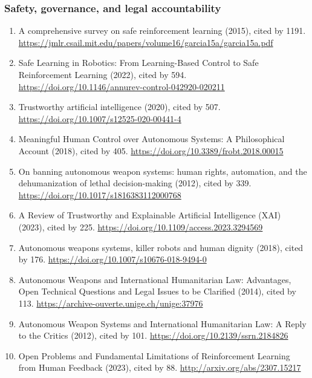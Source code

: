 \documentclass[
]{article}
\providecommand{\tightlist}{%
  \setlength{\itemsep}{0pt}\setlength{\parskip}{0pt}}
\begin{document}
\hypertarget{safety-governance-and-legal-accountability}{%
\subsubsection{Safety, governance, and legal
accountability}\label{safety-governance-and-legal-accountability}}

\begin{enumerate}
\def\labelenumi{\arabic{enumi}.}
\tightlist
\item
  A comprehensive survey on safe reinforcement learning (2015), cited by
  1191.
  \url{https://jmlr.csail.mit.edu/papers/volume16/garcia15a/garcia15a.pdf}
\item
  Safe Learning in Robotics: From Learning-Based Control to Safe
  Reinforcement Learning (2022), cited by 594.
  \url{https://doi.org/10.1146/annurev-control-042920-020211}
\item
  Trustworthy artificial intelligence (2020), cited by 507.
  \url{https://doi.org/10.1007/s12525-020-00441-4}
\item
  Meaningful Human Control over Autonomous Systems: A Philosophical
  Account (2018), cited by 405.
  \url{https://doi.org/10.3389/frobt.2018.00015}
\item
  On banning autonomous weapon systems: human rights, automation, and
  the dehumanization of lethal decision-making (2012), cited by 339.
  \url{https://doi.org/10.1017/s1816383112000768}
\item
  A Review of Trustworthy and Explainable Artificial Intelligence (XAI)
  (2023), cited by 225.
  \url{https://doi.org/10.1109/access.2023.3294569}
\item
  Autonomous weapons systems, killer robots and human dignity (2018),
  cited by 176. \url{https://doi.org/10.1007/s10676-018-9494-0}
\item
  Autonomous Weapons and International Humanitarian Law: Advantages,
  Open Technical Questions and Legal Issues to be Clarified (2014),
  cited by 113. \url{https://archive-ouverte.unige.ch/unige:37976}
\item
  Autonomous Weapon Systems and International Humanitarian Law: A Reply
  to the Critics (2012), cited by 101.
  \url{https://doi.org/10.2139/ssrn.2184826}
\item
  Open Problems and Fundamental Limitations of Reinforcement Learning
  from Human Feedback (2023), cited by 88.
  \url{http://arxiv.org/abs/2307.15217}
\end{enumerate}
\end{document}
